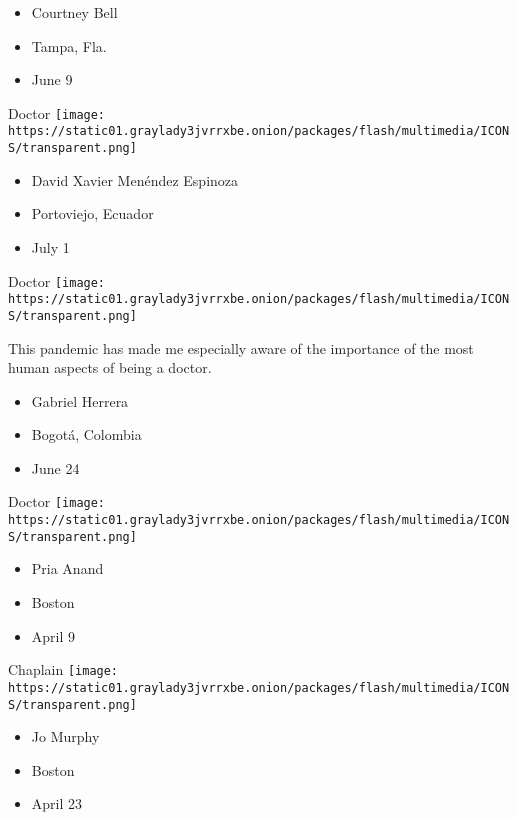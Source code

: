 \begin{itemize}
\tightlist
\item
  Courtney Bell
\item
  Tampa, Fla.
\item
  June 9
\end{itemize}

\protect\hyperlink{item-david-xavier-menendez-espinoza}{}

Doctor
\texttt{[image: https://static01.graylady3jvrrxbe.onion/packages/flash/multimedia/ICONS/transparent.png]}

\begin{itemize}
\tightlist
\item
  David Xavier Menéndez Espinoza
\item
  Portoviejo, Ecuador
\item
  July 1
\end{itemize}

\protect\hyperlink{item-gabriel-herrera}{}

Doctor
\texttt{[image: https://static01.graylady3jvrrxbe.onion/packages/flash/multimedia/ICONS/transparent.png]}

This pandemic has made me especially aware of the importance of the most
human aspects of being a doctor.

\begin{itemize}
\tightlist
\item
  Gabriel Herrera
\item
  Bogotá, Colombia
\item
  June 24
\end{itemize}

\protect\hyperlink{item-pria-anand}{}

Doctor
\texttt{[image: https://static01.graylady3jvrrxbe.onion/packages/flash/multimedia/ICONS/transparent.png]}

\begin{itemize}
\tightlist
\item
  Pria Anand
\item
  Boston
\item
  April 9
\end{itemize}

\protect\hyperlink{item-jo-murphy}{}

Chaplain
\texttt{[image: https://static01.graylady3jvrrxbe.onion/packages/flash/multimedia/ICONS/transparent.png]}

\begin{itemize}
\tightlist
\item
  Jo Murphy
\item
  Boston
\item
  April 23
\end{itemize}

